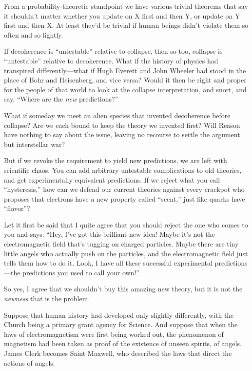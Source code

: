 {
 From a probability-theoretic standpoint we have various trivial
theorems that say it shouldn't matter whether you
update on X first and then Y, or update on Y first and then X. At least
they'd be trivial if human beings
didn't violate them so often and so lightly.}

{
 If decoherence is
``untestable'' relative to collapse,
then so too, collapse is
``untestable'' relative to
decoherence. What if the history of physics had transpired
differently---what if Hugh Everett and John Wheeler had stood in the
place of Bohr and Heisenberg, and vice versa? Would it then be right
and proper for the people of that world to look at the collapse
interpretation, and snort, and say, ``Where are the
\textit{new} predictions?''}

{
 What if someday we meet an alien species that invented decoherence
before collapse? Are we each bound to keep the theory we invented
first? Will Reason have nothing to say about the issue, leaving no
recourse to settle the argument but interstellar war?}

{
 But if we revoke the requirement to yield new predictions, we are
left with scientific chaos. You can add arbitrary untestable
complications to old theories, and get experimentally equivalent
predictions. If we reject what you call
``hysteresis,'' how can we defend
our current theories against every crackpot who proposes that electrons
have a new property called
``scent,'' just like quarks have
``flavor''?}

{
 Let it first be said that I quite agree that you should reject the
one who comes to you and says: ``Hey,
I've got this brilliant new idea! Maybe
it's not the electromagnetic field
that's tugging on charged particles. Maybe there are
tiny little angels who actually push on the particles, and the
electromagnetic field just tells them how to do it. Look, I have all
these successful experimental predictions---the predictions you used to
call your own!''}

{
 So yes, I agree that we shouldn't buy this amazing
new theory, but it is not the \textit{newness} that is the problem.}

{
 Suppose that human history had developed only slightly
differently, with the Church being a primary grant agency for Science.
And suppose that when the laws of electromagnetism were first being
worked out, the phenomenon of magnetism had been taken as proof of the
existence of unseen spirits, of angels. James Clerk becomes Saint
Maxwell, who described the laws that direct the actions of angels.}


